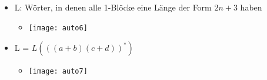 \begin{itemize}
\item L: Wörter, in denen alle 1-Blöcke eine Länge der Form $2n+3$ haben
	\begin{itemize}
	\item[]
		\begin{center}
		\texttt{[image: auto6]}
		\end{center}	
	\end{itemize}
	
\item L = $L(((a+b)(c+d))^*)$
	\begin{itemize}
	\item[]
		\begin{center}
		\texttt{[image: auto7]}
		\end{center}	
	\end{itemize}

\end{itemize}

\pagebreak

